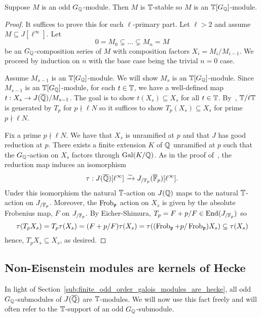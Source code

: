\documentclass{article}
\begin{document}
\begin{theorem}\label{thm:G_modules_are_Hecke}
    Suppose $M$ is an odd $G_{\mathbb{Q}}$-module. Then $M$ is $\mathbb{T}$-stable so $M$ is
    an $\mathbb{T}[G_{\mathbb{Q}}]$-module.
\end{theorem}
\begin{proof}
    It suffices to prove this for each $\ell$-primary part. Let $\ell>2$ and
    assume $M\subseteq J[\ell^\infty]$. Let
    \[
        0 = M_0 \subsetneq \ldots \subsetneq M_n = M
    \]
    be an $G_{\mathbb{Q}}$-composition series of $M$ with composition factors $X_i =
    M_i/M_{i-1}$. We proceed by induction on $n$ with the base
    case being the trivial $n=0$ case. 
    
    Assume $M_{s-1}$ is an $\mathbb{T}[G_{\mathbb{Q}}]$-module. We will show $M_s$ is an
    $\mathbb{T}[G_{\mathbb{Q}}]$-module. Since $M_{s-1}$ is an $\mathbb{T}[G_{\mathbb{Q}}]$-module, for each
    $t\in \mathbb{T}$, we have a well-defined map $t:X_s\to J(\overline{\mathbb{Q}})/M_{s-1}$. The
    goal is to show $t(X_s)\subseteq X_s$ for all $t\in \mathbb{T}$.
    By~\cite[Proposition 2]{ribet:mult_p_finite}, $\mathbb{T}/\ell \mathbb{T}$ is generated
    by $T_p$ for $p\nmid \ell N$ so it suffices to show $T_p(X_s)\subseteq X_s$
    for prime $p\nmid \ell N$.

    Fix a prime $p\nmid \ell N$. We have that $X_s$ is unramified at $p$ and
    that $J$ has good reduction at $p$. There exists a finite extension $K$ of
    $\mathbb{Q}$ unramified at $p$ such that the $G_{\mathbb{Q}}$-action on $X_s$ factors
    through $\operatorname{Gal}(K/\mathbb{Q})$. As in the proof of~\cite[Lemma
    12.6.2]{ribet-stein:mod}, the reduction map induces an isomorphism
    \[
        \tau:J(\overline{\mathbb{Q}})[\ell^\infty] \xrightarrow{\sim} J_{/\mathbb{F}_p} (\overline{\mathbb{F}}_p)[\ell^\infty].
    \]
    Under this isomorphism the natural $\mathbb{T}$-action on $J(\mathbb{Q})$ maps to the
    natural $\mathbb{T}$-action on $J_{/\mathbb{F}_p}$. Moreover, the $\operatorname{Frob}_{\mathfrak{p}}$ action on
    $X_s$ is given by the absolute Frobenius map, $F$ on $J_{/\mathbb{F}_p}$. By
    Eicher-Shimura, $T_p = F+p/F\in \operatorname{End}(J_{/\mathbb{F}_p})$ so
    \[
    \tau(T_p X_s) 
    = T_p\tau(X_s) 
    = (F+p/F)\tau(X_s)
    = \tau((\operatorname{Frob}_{\mathfrak{p}}+p/\operatorname{Frob}_{\mathfrak{p}})X_s)
    \subseteq \tau(X_s)
    \]
    hence, $T_p X_s\subseteq X_s$, as desired.
\end{proof}


\subsection{Non-Eisenstein modules are kernels of Hecke}%
\label{sub:non_eisenstein_modules_are_kernels_of_hecke}

In light of Section~\ref{sub:finite_odd_order_galois_modules_are_hecke}, all
odd $G_{\mathbb{Q}}$-submodules of $J(\overline{\mathbb{Q}})$ are $\mathbb{T}$-modules. We will now
use this fact freely and will often refer to the $\mathbb{T}$-support of an odd
$G_{\mathbb{Q}}$-submodule.
\end{document}
